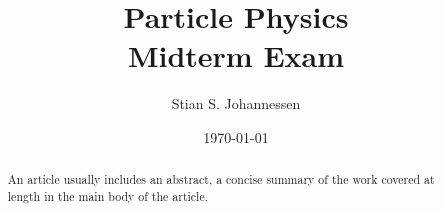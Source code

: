 \documentclass[%
 reprint,
 amsmath,amssymb,
 aps,
]{revtex4-2}
\begin{document}

\title{Particle Physics\\Midterm Exam}

\author{Stian S. Johannessen}

\date{\today}%

\begin{abstract}
An article usually includes an abstract, a concise summary of the work
covered at length in the main body of the article. 
\end{abstract}

\maketitle




\nocite{*}

\end{document}
